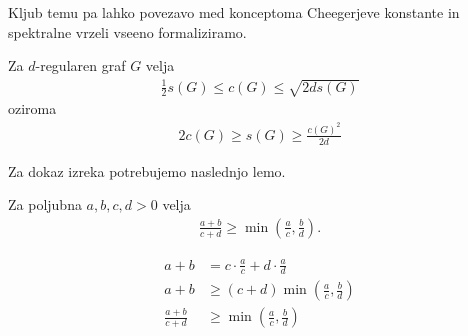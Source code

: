 Kljub temu pa lahko povezavo med konceptoma Cheegerjeve konstante in spektralne vrzeli vseeno formaliziramo\cite{chung-cheeger}.
\begin{izrek}
    Za \(d\)-regularen graf \(G\) velja 
    \begin{align*}
        \frac{1}{2}s(G) \leq c(G) \leq \sqrt{2ds(G)}
    \end{align*}
    oziroma
    \begin{align*}
        2c(G) \geq s(G) \geq \frac{c(G)^2}{2d}
    \end{align*} 
\end{izrek}
Za dokaz izreka potrebujemo naslednjo lemo.
\begin{lema}\label{cheegerLema}
    Za poljubna \(a, b, c, d > 0\) velja
    \begin{align*}
        \frac{a+b}{c+d} \geq \min\left(\frac{a}{c}, \frac{b}{d}\right).
    \end{align*}
\end{lema}
\begin{dokaz}
    \begin{align*}
        a+b &= c\cdot\frac{a}{c} + d\cdot \frac{a}{d}\\
        a+b &\geq (c+d) \min\left(\frac{a}{c}, \frac{b}{d}\right)\\
        \frac{a+b}{c+d} &\geq \min\left(\frac{a}{c}, \frac{b}{d}\right)
    \end{align*}
\end{dokaz}
